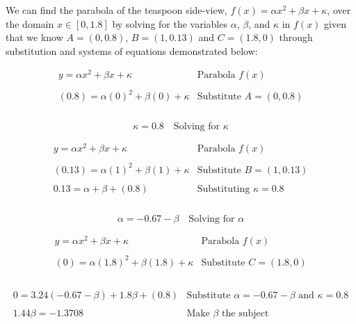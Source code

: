 \documentclass[12pt]{article}
\begin{document}
We can find the parabola of the teaspoon side-view, $f(x)=\alpha x^2+ \beta x+ \kappa$, over the domain $x \in [0,1.8]$ by solving for the variables $\alpha$, $\beta$, and $\kappa$ in $f(x)$ given that we know $A=(0,0.8)$, $B=(1,0.13)$ and $C=(1.8,0)$ through substitution and systems of equations demonstrated below:

$$
\begin{array}{l|c}
    y = \alpha x^2 + \beta x + \kappa & \text{Parabola } f(x) \\ \\
    (0.8) = \alpha (0)^2 + \beta (0) + \kappa & \text{Substitute } A=(0,0.8) \\ \\
 \end{array}
$$

\begin{equation}\label{solve.kappa}
    \boxed{\kappa = 0.8}  \quad \text{Solving for } \kappa
\end{equation}

$$
\begin{array}{l|c}
    y = \alpha x^2 + \beta x + \kappa & \text{Parabola } f(x) \\ \\
    (0.13) = \alpha (1)^2 + \beta (1) + \kappa & \text{Substitute } B=(1,0.13) \\ \\
    0.13 = \alpha + \beta + (0.8) & \text{Substituting } \kappa=0.8 \\ \\
 \end{array} 
$$

\begin{equation}\label{solve.alpha}
    \boxed{ \alpha = -0.67 - \beta }  \quad \text{Solving for } \alpha
\end{equation}

$$
\begin{array}{l|c}
    y = \alpha x^2 + \beta x + \kappa & \text{Parabola } f(x) \\ \\
    (0) = \alpha (1.8)^2 + \beta (1.8) + \kappa & \text{Substitute } C=(1.8,0) \\ \\
\end{array}
$$

$$
\begin{array}{l|c}
    0 = 3.24(-0.67 -\beta) + 1.8 \beta + (0.8) & \text{Substitute } \alpha =-0.67- \beta \text{ and } \kappa =0.8\\ \\
    1.44 \beta = -1.3708 & \text{Make } \beta \text{ the subject} \\ \\
\end{array}
$$
\end{document}
